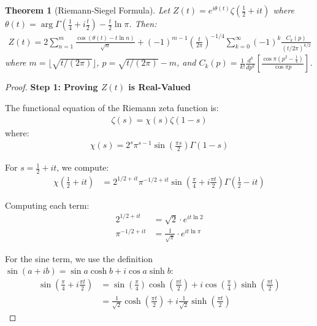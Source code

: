 \documentclass{article}
\newtheorem{theorem}{Theorem}
\begin{document}
\begin{theorem}[Riemann-Siegel Formula]
Let $Z(t) = e^{i\theta(t)}\zeta\left(\frac{1}{2}+it\right)$ where $\theta(t) = \arg\Gamma\left(\frac{1}{4}+i\frac{t}{2}\right) - \frac{t}{2}\ln\pi$. Then:
\begin{align}\label{eq:riemann_siegel}
Z(t) = 2\sum_{n=1}^m \frac{\cos(\theta(t)-t\ln n)}{\sqrt{n}} + (-1)^{m-1}\left(\frac{t}{2\pi}\right)^{-1/4}\sum_{k=0}^\infty (-1)^k \frac{C_k(p)}{(t/2\pi)^{k/2}}
\end{align}
where $m = \lfloor \sqrt{t/(2\pi)} \rfloor$, $p = \sqrt{t/(2\pi)} - m$, and $C_k(p) = \frac{1}{k!}\frac{d^k}{dp^k}\left[\frac{\cos\pi(p^2-\frac{1}{4})}{\cos\pi p}\right]$.
\end{theorem}

\begin{proof}
\textbf{Step 1: Proving $Z(t)$ is Real-Valued}

The functional equation of the Riemann zeta function is:
\begin{align}\label{eq:func_equation}
\zeta(s) = \chi(s)\zeta(1-s)
\end{align}
where:
\begin{align}\label{eq:chi_def}
\chi(s) = 2^s\pi^{s-1}\sin\left(\frac{\pi s}{2}\right)\Gamma(1-s)
\end{align}

For $s = \frac{1}{2}+it$, we compute:
\begin{align}\label{eq:chi_substitution}
\chi\left(\frac{1}{2}+it\right) &= 2^{1/2+it}\pi^{-1/2+it}\sin\left(\frac{\pi}{4}+i\frac{\pi t}{2}\right)\Gamma\left(\frac{1}{2}-it\right)
\end{align}

Computing each term:
\begin{align}
2^{1/2+it} &= \sqrt{2} \cdot e^{it\ln 2} \label{eq:exp_2}\\
\pi^{-1/2+it} &= \frac{1}{\sqrt{\pi}} \cdot e^{it\ln\pi} \label{eq:exp_pi}
\end{align}

For the sine term, we use the definition $\sin(a+ib) = \sin a \cosh b + i\cos a \sinh b$:
\begin{align}
\sin\left(\frac{\pi}{4}+i\frac{\pi t}{2}\right) &= \sin\left(\frac{\pi}{4}\right)\cosh\left(\frac{\pi t}{2}\right) + i\cos\left(\frac{\pi}{4}\right)\sinh\left(\frac{\pi t}{2}\right) \label{eq:sine_complex}\\
&= \frac{1}{\sqrt{2}}\cosh\left(\frac{\pi t}{2}\right) + i\frac{1}{\sqrt{2}}\sinh\left(\frac{\pi t}{2}\right) \label{eq:sine_expansion}
\end{align}


\end{proof}
\end{document}
